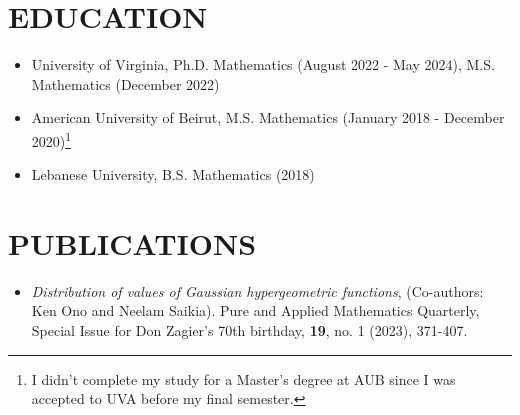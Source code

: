 \documentclass[margin, 10pt]{res} %
\begin{document}
\begin{resume}

 \begin{comment}
\section{OBJECTIVE}  

Motivated college student with special interests in Mechanical Engineering and experience with food service, retail, and personal services. Proven track record of excellent performance and advancement.

\end{comment}


\section{EDUCATION}

\begin{itemize}
    \item University of Virginia, Ph.D. Mathematics (August 2022 - May 2024), M.S. Mathematics (December 2022)
    \item American University of Beirut, M.S. Mathematics (January 2018 - December 2020)\footnote{I didn't complete my study for a Master's degree at AUB since I was accepted to UVA before my final semester.}
    \item Lebanese University, B.S. Mathematics (2018)
\end{itemize}

\section{PUBLICATIONS}
\begin{itemize}
    \item \emph{Distribution of values of Gaussian hypergeometric functions}, (Co-authors: Ken Ono and Neelam Saikia).\newline
    Pure and Applied Mathematics Quarterly, Special Issue for Don Zagier’s 70th birthday,  {\bf 19}, no. 1 (2023), 371-407.


\end{itemize}
\end{resume}
\end{document}

